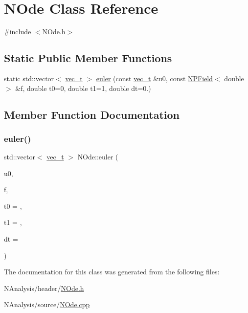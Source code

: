 \hypertarget{class_n_ode}{}\section{N\+Ode Class Reference}
\label{class_n_ode}


{\ttfamily \#include $<$N\+Ode.\+h$>$}

\subsection*{Static Public Member Functions}
\begin{DoxyCompactItemize}
\item 
static std\+::vector$<$ \mbox{\hyperlink{group___n_algebra_ga0a2cfc67e738a3d73e4f12098c4c07f6}{vec\+\_\+t}} $>$ \mbox{\hyperlink{class_n_ode_aba64ed3eb2ec85a138556d57fc20cdfd}{euler}} (const \mbox{\hyperlink{group___n_algebra_ga0a2cfc67e738a3d73e4f12098c4c07f6}{vec\+\_\+t}} \&u0, const \mbox{\hyperlink{class_n_p_field}{N\+P\+Field}}$<$ double $>$ \&f, double t0=0, double t1=1, double dt=0.)
\end{DoxyCompactItemize}


\subsection{Member Function Documentation}
\mbox{\label{class_n_ode_aba64ed3eb2ec85a138556d57fc20cdfd}} 
\subsubsection{\texorpdfstring{euler()}{euler()}}
{\footnotesize\ttfamily std\+::vector$<$ \mbox{\hyperlink{group___n_algebra_ga0a2cfc67e738a3d73e4f12098c4c07f6}{vec\+\_\+t}} $>$ N\+Ode\+::euler (\begin{DoxyParamCaption}\item[{const \mbox{\hyperlink{group___n_algebra_ga0a2cfc67e738a3d73e4f12098c4c07f6}{vec\+\_\+t}} \&}]{u0,  }\item[{const \mbox{\hyperlink{class_n_p_field}{N\+P\+Field}}$<$ double $>$ \&}]{f,  }\item[{double}]{t0 = {},  }\item[{double}]{t1 = {},  }\item[{double}]{dt = {} }\end{DoxyParamCaption})\hspace{0.3cm}{\ttfamily [static]}}



The documentation for this class was generated from the following files\+:\begin{DoxyCompactItemize}
\item 
N\+Analysis/header/\mbox{\hyperlink{_n_ode_8h}{N\+Ode.\+h}}\item 
N\+Analysis/source/\mbox{\hyperlink{_n_ode_8cpp}{N\+Ode.\+cpp}}\end{DoxyCompactItemize}
